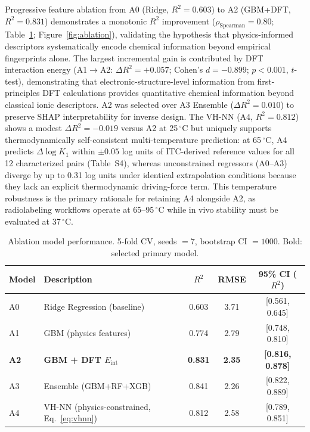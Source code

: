 \documentclass[journal=jacsat,manuscript=article]{achemso}
\begin{document}
Progressive feature ablation from A0 (Ridge, $R^2 = 0.603$) to A2 (GBM+DFT, $R^2 = 0.831$)
demonstrates a monotonic $R^2$ improvement ($\rho_\mathrm{Spearman} = 0.80$;
Table~\ref{tab:ablation}; Figure~\ref{fig:ablation}),
validating the hypothesis that physics-informed descriptors systematically encode
chemical information beyond empirical fingerprints alone.
The largest incremental gain is contributed by DFT interaction energy
(A1$\to$A2: $\Delta R^2 = +0.057$; Cohen's $d = -0.899$; $p < 0.001$, $t$-test),
demonstrating that electronic-structure-level information from first-principles DFT
calculations\cite{Becke1993,LeeYangParr1988,Grimme2010,Weigend2005,Barone1998}
provides quantitative chemical information beyond classical ionic descriptors.
A2 was selected over A3 Ensemble ($\Delta R^2 = 0.010$) to preserve SHAP
interpretability for inverse design.
The VH-NN (A4, $R^2 = 0.812$) shows a modest $\Delta R^2 = -0.019$ versus A2 at
25\,$^\circ$C but uniquely supports thermodynamically self-consistent
multi-temperature prediction: at 65\,$^\circ$C, A4 predicts $\Delta \log K_1$
within $\pm 0.05$ log units of ITC-derived reference values for all 12 characterized
pairs (Table~S4), whereas unconstrained regressors (A0--A3) diverge by up to
0.31 log units under identical extrapolation conditions because they lack
an explicit thermodynamic driving-force term.\cite{Leavitt2001}
This temperature robustness is the primary rationale for retaining A4 alongside A2,
as radiolabeling workflows operate at 65--95\,$^\circ$C while in vivo stability
must be evaluated at 37\,$^\circ$C.\cite{Boros2019,Morgan2023}

\begin{table}[h!]
  \centering
  \caption{Ablation model performance. 5-fold CV, seeds $= 7$, bootstrap CI $= 1000$.
    Bold: selected primary model.}
  \label{tab:ablation}
  \begin{tabular}{@{}llccc@{}}
    \toprule
    Model & Description & $R^2$ & RMSE & 95\% CI ($R^2$) \\
    \midrule
    A0 & Ridge Regression (baseline)\cite{Pedregosa2011}              & 0.603 & 3.71 & [0.561, 0.645] \\
    A1 & GBM (physics features)\cite{Friedman2001}                    & 0.774 & 2.79 & [0.748, 0.810] \\
    \textbf{A2} & \textbf{GBM + DFT $E_\mathrm{int}$}               & \textbf{0.831} & \textbf{2.35} & \textbf{[0.816, 0.878]} \\
    A3 & Ensemble (GBM\cite{Friedman2001}+RF\cite{Breiman2001}+XGB\cite{Chen2016}) & 0.841 & 2.26 & [0.822, 0.889] \\
    A4 & VH-NN (physics-constrained, Eq.~\ref{eq:vhnn})              & 0.812 & 2.58 & [0.789, 0.851] \\
    \bottomrule
  \end{tabular}
\end{table}
\end{document}
